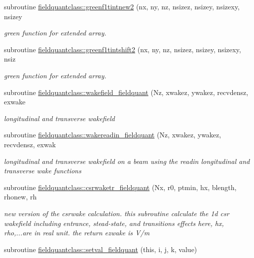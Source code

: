 \begin{DoxyCompactItemize}
subroutine \mbox{\hyperlink{namespacefieldquantclass_a32715398e47b9a73bd6cde1ae980e0a3}{fieldquantclass\+::greenf1tintnew2}} (nx, ny, nz, nsizez, nsizey, nsizexy, nsizey
\begin{DoxyCompactList}\small\item\em green function for extended array. \end{DoxyCompactList}\item 
subroutine \mbox{\hyperlink{namespacefieldquantclass_a25df6116d62bb56b5711333426dcd74d}{fieldquantclass\+::greenf1tintshift2}} (nx, ny, nz, nsizez, nsizey, nsizexy, nsiz
\begin{DoxyCompactList}\small\item\em green function for extended array. \end{DoxyCompactList}\item 
subroutine \mbox{\hyperlink{namespacefieldquantclass_a61fa5f8980736fbc19fa50224214727b}{fieldquantclass\+::wakefield\+\_\+fieldquant}} (Nz, xwakez, ywakez, recvdensz, exwake
\begin{DoxyCompactList}\small\item\em longitudinal and transverse wakefield \end{DoxyCompactList}\item 
subroutine \mbox{\hyperlink{namespacefieldquantclass_afc918d38222797f1f06903259e48461b}{fieldquantclass\+::wakereadin\+\_\+fieldquant}} (Nz, xwakez, ywakez, recvdensz, exwak
\begin{DoxyCompactList}\small\item\em longitudinal and transverse wakefield on a beam using the readin longitudinal and transverse wake functions \end{DoxyCompactList}\item 
subroutine \mbox{\hyperlink{namespacefieldquantclass_a773b62d57c290818337131902b979b43}{fieldquantclass\+::csrwaketr\+\_\+fieldquant}} (Nx, r0, ptmin, hx, blength, rhonew, rh
\begin{DoxyCompactList}\small\item\em new version of the csrwake calculation. this subroutine calculate the 1d csr wakefield including entrance, stead-\/state, and transitions effects here, hx, rho,...are in real unit. the return ezwake is V/m \end{DoxyCompactList}\item 
subroutine \mbox{\hyperlink{namespacefieldquantclass_a05318a0c571b3210e31af48028673474}{fieldquantclass\+::setval\+\_\+fieldquant}} (this, i, j, k, value)
\item 

\end{DoxyCompactItemize}

